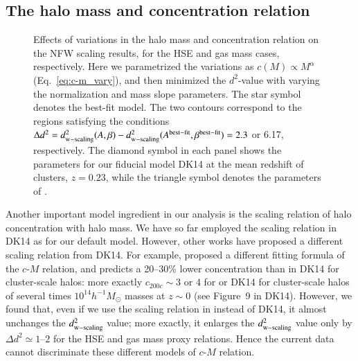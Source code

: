 \documentclass[iop, apj]{emulateapj}
\newcommand{\mt}[1]{{\textcolor{blue}{#1}}}
\newcommand{\?}{\stackrel{?}{=}}
\begin{document}
\subsection{The halo mass and concentration relation}
\label{sec:m-c}
%
\begin{figure*}[th]
%
 \caption{Effects of variations in the halo mass and concentration relation on the
NFW scaling results, for the HSE and gas mass cases, respectively. Here
we parametrized the variations as $c(M)\propto M^{\alpha}$
(Eq.~\ref{eq:c-m_vary}), and then minimized the $d^2$-value with varying
the normalization and mass slope parameters. The star symbol denotes the
best-fit model.  The two contours correspond to the regions satisfying
the conditions $\Delta d^2=d_{\rm w-scaling}^2(A,\beta) - d_{\rm
w-scaling}^2(A^{\rm best-fit},\beta^{\rm best-fit})= 2.3$ or 6.17,
respectively.  The diamond symbol in each panel shows the parameters for
our fiducial model DK14 at the mean redshift of clusters, $z=0.23$,
while the triangle symbol denotes the parameters of
\citet{Duffyetal:08}.
}
\label{fig:m-c}
\end{figure*}
%
Another important model ingredient in our analysis is the scaling
relation of halo concentration with halo mass. We have so far employed
the scaling relation in DK14 as for our default model. However, other
works have proposed a different scaling relation from DK14.  For
example, \citet{Duffyetal:08} proposed a different fitting formula of
the $c$-$M$ relation, and predicts a 20--30\% lower concentration than
in DK14 for cluster-scale halos: more exactly $c_{200c}\sim 3$ or 4 for
\citet{Duffyetal:08} or DK14 for cluster-scale halos of several times
$10^{14}h^{-1}M_\odot$ masses at $z\sim 0$ (see Figure~9 in DK14).
However, we found that, even if we use the scaling relation in
\citet{Duffyetal:08} instead of DK14, it almost unchanges the $d^2_{\rm
w-scaling}$ value; more exactly, it enlarges the $d^2_{\rm w-scaling}$
value only by $\Delta d^2\simeq 1$--$2$ for the HSE and gas mass
proxy relations. Hence the current data cannot discriminate these
different models of $c$-$M$ relation.
\end{document}

